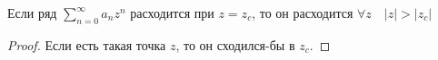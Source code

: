 \begin{consequence} \thmslashn

    Если ряд $\sum\limits_{n=0}^{\infty} a_{n}z^{n}$ расходится при $z=z_{c}$, то он расходится $\forall{z}\quad |z| > |z_{c}|$
    \begin{proof} \thmslashn
    
        Если есть такая точка $z$, то он сходился-бы в $z_{c}$.
    \end{proof}
\end{consequence}
